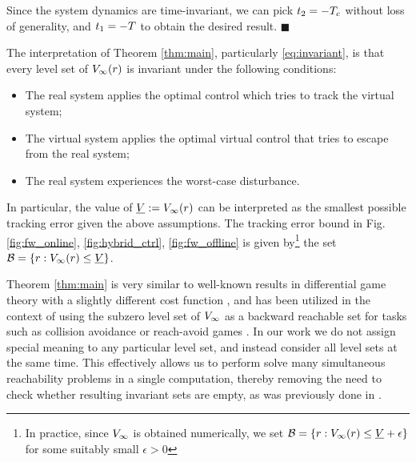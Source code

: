    Since the system dynamics are time-invariant, we can pick $t_2 = -T_c$ without loss of generality, and $t_1 = -T$ to obtain the desired result. \hfill $\blacksquare$
 
\begin{rem}
  The interpretation of Theorem \ref{thm:main}, particularly \eqref{eq:invariant}, is that every level set of $V_\infty(r)$ is invariant under the following conditions:
  \begin{itemize}
    \item The real system applies the optimal control which tries to track the virtual system;
    \item The virtual system applies the optimal virtual control that tries to escape from the real system;
    \item The real system experiences the worst-case disturbance.
  \end{itemize}
  
  In particular, the value of $\underline{V} := V_\infty(r)$ can be interpreted as the smallest possible tracking error  given the above assumptions. The tracking error bound in Fig. \ref{fig:fw_online}, \ref{fig:hybrid_ctrl}, \ref{fig:fw_offline} is given by\footnote{In practice, since $V_\infty$ is obtained numerically, we set $\mathcal B = \{r: V_\infty(r) \le \underline{V} + \epsilon\}$ for some suitably small $\epsilon>0$} the set $\mathcal B = \{r: V_\infty(r) \le \underline{V}\}$.
  
\end{rem}
 
 
 \begin{rem} 
   Theorem \ref{thm:main} is very similar to well-known results in differential game theory with a slightly different cost function \cite{}, and has been utilized in the context of using the subzero level set of $V_\infty$ as a backward reachable set for tasks such as collision avoidance or reach-avoid games \cite{}. In our work we do not assign special meaning to any particular level set, and instead consider all level sets at the same time. This effectively allows us to perform solve many simultaneous reachability problems in a single computation, thereby removing the need to check whether resulting invariant sets are empty, as was previously done in .
 \end{rem}

